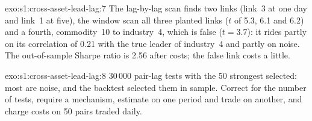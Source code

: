 \begin{solution}{exo:s1:cross-asset-lead-lag:7}
The lag-by-lag scan finds two links (link~3 at one day and link~1 at five), the window scan all three planted links ($t$ of 5.3, 6.1 and 6.2) and a
fourth, commodity~10 to industry~4, which is false ($t = 3.7$): it rides partly on its correlation of 0.21 with the true leader of industry~4 and partly
on noise. The out-of-sample Sharpe ratio is 2.56 after costs; the false link costs a little.
\end{solution}

\begin{solution}{exo:s1:cross-asset-lead-lag:8}
30\,000 pair-lag tests with the 50 strongest selected: most are noise, and the backtest selected them in sample. Correct for the number of tests, require
a mechanism, estimate on one period and trade on another, and charge costs on 50 pairs traded daily.
\end{solution}

